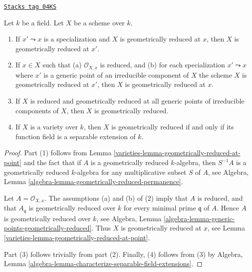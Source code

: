 \begin{lemma}
\label{varieties-lemma-generic-points-geometrically-reduced}
\href{https://stacks.math.columbia.edu/tag/04KS}{\texttt{Stacks tag 04KS}}

Let $k$ be a field.
Let $X$ be a scheme over $k$.
\begin{enumerate}
\item If $x' \leadsto x$ is a specialization and $X$ is geometrically
reduced at $x$, then $X$ is geometrically reduced at $x'$.
\item If $x \in X$ such that (a) $\mathcal{O}_{X, x}$
is reduced, and (b) for each specialization $x' \leadsto x$ where
$x'$ is a generic point of an irreducible component of $X$ the
scheme $X$ is geometrically reduced at $x'$, then $X$ is geometrically
reduced at $x$.
\item If $X$ is reduced and geometrically reduced at all generic
points of irreducible components of $X$, then $X$ is geometrically
reduced.
\item If $X$ is a variety over $k$,
then $X$ is geometrically reduced if and only if its function field
is a separable extension of $k$.
\end{enumerate}
\end{lemma}

\begin{proof}

Part (1) follows from
Lemma \ref{varieties-lemma-geometrically-reduced-at-point}
and the fact that if $A$ is a geometrically reduced
$k$-algebra, then $S^{-1}A$ is a geometrically reduced $k$-algebra for
any multiplicative subset $S$ of $A$, see
Algebra, Lemma \ref{algebra-lemma-geometrically-reduced-permanence}.

\medskip\noindent
Let $A = \mathcal{O}_{X, x}$. The assumptions (a) and (b) of (2) imply
that $A$ is reduced, and that $A_{\mathfrak q}$ is geometrically
reduced over $k$ for every minimal prime $\mathfrak q$ of $A$.
Hence $A$ is geometrically reduced over $k$, see
Algebra, Lemma \ref{algebra-lemma-generic-points-geometrically-reduced}.
Thus $X$ is geometrically reduced at $x$, see
Lemma \ref{varieties-lemma-geometrically-reduced-at-point}.

\medskip\noindent
Part (3) follows trivially from part (2). Finally, (4) follows
from (3) by Algebra,
Lemma \ref{algebra-lemma-characterize-separable-field-extensions}.
\end{proof}

